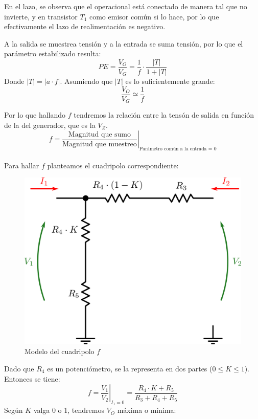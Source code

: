 En el lazo, se observa que el operacional est\'a conectado de manera tal que no invierte, y en transistor $T_1$ como emisor com\'un si lo hace, por lo que efectivamente el lazo de realimentaci\'on es negativo.\par
A la salida se muestrea tensi\'on y a la entrada se suma tensi\'on, por lo que el par\'ametro estabilizado resulta:
\[
PE = \frac{V_O}{V_G} = \frac{1}{f} \cdot \frac{|T|}{1+|T|}
\]
Donde $|T| = |a\cdot f|$. Asumiendo que $|T|$ es lo suficientemente grande:
\[
\frac{V_O}{V_G} \simeq \frac{1}{f}
\]

Por lo que hallando $f$ tendremos la relaci\'on entre la tens\'on de salida en funci\'on de la del generador, que es la $V_Z$.
\[
f = \left. \frac{\textrm{Magnitud que sumo}}{\textrm{Magnitud que muestreo}} \right|_{\textrm{Par\'ametro com\'un a la entrada = 0}}
\]
\\
Para hallar $f$ planteamos el cuadripolo correspondiente:

\begin{figure}[!ht]
\begin{centering}
\includegraphics[scale=0.32]{Imagenes/CuadripoloF.png}
\par\end{centering}
\caption{Modelo del cuadripolo $f$}

\end{figure}

Dado que $R_4$ es un potenci\'ometro, se la representa en dos partes ($0 \leq K \leq 1$). Entonces se tiene:
\[
f = \left. \frac{V_1}{V_2} \right|_{I_1=0} = \frac{R_4 \cdot K + R_5}{R_3 + R_4 + R_5}
\]
Seg\'un $K$ valga 0 o 1, tendremos $V_O$ m\'axima o m\'inima:

